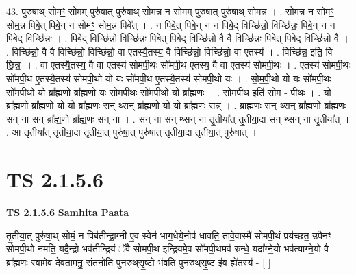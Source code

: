 \documentclass[17pt]{extarticle}
\begin{document}
43. पुरु॑षा॒थ् सोमꣳ॒॒ सोम॒म् पुरु॑षा॒त् पुरु॑षा॒थ् सोम॒न्न न सोम॒म् पुरु॑षा॒त् पुरु॑षा॒थ् सोम॒न्न । . सोम॒न्न न सोमꣳ॒॒ सोम॒न्न पिबे॒त् पिबे॒न् न सोमꣳ॒॒ सोम॒न्न पिबे᳚त् । . न पिबे॒त् पिबे॒न् न न पिबे॒द् विच्छि॑न्नो॒ विच्छि॑न्नः॒ पिबे॒न् न न पिबे॒द् विच्छि॑न्नः । . पिबे॒द् विच्छि॑न्नो॒ विच्छि॑न्नः॒ पिबे॒त् पिबे॒द् विच्छि॑न्नो॒ वै वै विच्छि॑न्नः॒ पिबे॒त् पिबे॒द् विच्छि॑न्नो॒ वै । . विच्छि॑न्नो॒ वै वै विच्छि॑न्नो॒ विच्छि॑न्नो॒ वा ए॒तस्यै॒तस्य॒ वै विच्छि॑न्नो॒ विच्छि॑न्नो॒ वा ए॒तस्य॑ । . विच्छि॑न्न॒ इति॒ वि - छि॒न्नः॒ । . वा ए॒तस्यै॒तस्य॒ वै वा ए॒तस्य॑ सोमपी॒थः सो॑मपी॒थ ए॒तस्य॒ वै वा ए॒तस्य॑ सोमपी॒थः । . ए॒तस्य॑ सोमपी॒थः सो॑मपी॒थ ए॒तस्यै॒तस्य॑ सोमपी॒थो यो यः सो॑मपी॒थ ए॒तस्यै॒तस्य॑ सोमपी॒थो यः । . सो॒म॒पी॒थो यो यः सो॑मपी॒थः सो॑मपी॒थो यो ब्रा᳚ह्म॒णो ब्रा᳚ह्म॒णो यः सो॑मपी॒थः सो॑मपी॒थो यो ब्रा᳚ह्म॒णः । . सो॒म॒पी॒थ इति॑ सोम - पी॒थः । . यो ब्रा᳚ह्म॒णो ब्रा᳚ह्म॒णो यो यो ब्रा᳚ह्म॒णः सन् थ्सन् ब्रा᳚ह्म॒णो यो यो ब्रा᳚ह्म॒णः सन्न् । . ब्रा॒ह्म॒णः सन् थ्सन् ब्रा᳚ह्म॒णो ब्रा᳚ह्म॒णः सन् ना सन् ब्रा᳚ह्म॒णो ब्रा᳚ह्म॒णः सन् ना । . सन् ना सन् थ्सन् ना तृ॒तीया᳚त् तृ॒तीया॒दा सन् थ्सन् ना तृ॒तीया᳚त् । . आ तृ॒तीया᳚त् तृ॒तीया॒दा तृ॒तीया॒त् पुरु॑षा॒त् पुरु॑षात् तृ॒तीया॒दा तृ॒तीया॒त् पुरु॑षात् । \newline
\pagebreak
{}

\section{ TS 2.1.5.6 }

\textbf{TS 2.1.5.6 } \newline
\textbf{Samhita Paata} \newline

तृ॒तीया॒त् पुरु॑षा॒थ् सोमं॒ न पिब॑तीन्द्रा॒ग्नी ए॒व स्वेन॑ भाग॒धेये॒नोप॑ धावति॒ तावे॒वास्मै॑ सोमपी॒थं प्रय॑च्छत॒ उपै॑नꣳ सोमपी॒थो न॑मति॒ यदै॒न्द्रो भव॑तीन्द्रि॒यं ॅवै सो॑मपी॒थ इ॑न्द्रि॒यमे॒व सो॑मपी॒थमव॑ रुन्धे॒ यदा᳚ग्ने॒यो भव॑त्याग्ने॒यो वै ब्रा᳚ह्म॒णः स्वामे॒व दे॒वता॒मनु॒ संत॑नोति पुनरुथ्‌सृ॒ष्टो भ॑वति पुनरुथ्‌सृ॒ष्ट इ॑व॒ ह्ये॑तस्य॑ - [  ] \newline
\end{document}

